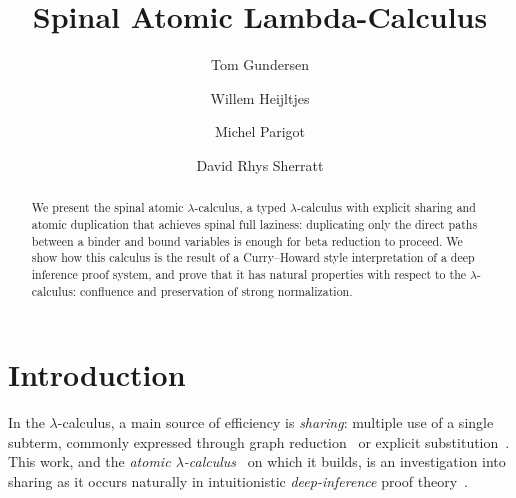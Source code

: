 \documentclass[a4paper,UKenglish,cleveref, autoref]{lipics-v2019}
\title{Spinal Atomic Lambda-Calculus}
\author
{Tom Gundersen}
{Red Hat, Inc.}
{teg@jklm.no}
{}
{}
\author
{Willem Heijltjes}
{University of Bath, UK \and \url{http://www.cs.bath.ac.uk/~wbh22/}}{w.b.heijltjes@bath.ac.uk}
{}
{Supported by EPSRC Project EP/R029121/1 \emph{Typed lambda-calculi with sharing and unsharing}}
\author
{Michel Parigot}
{Institut de Recherche en Informatique Fondamentale, CNRS \&\ Universit\'e de Paris, France} 
{michel.parigot@gmail.com}
{}
{Supported by ANR project 15-CE25-0014 FISP}
\author
{David Rhys Sherratt}
{Friedrich-Schiller University Jena, Germany}
{david.rhys.sherratt@uni-jena.de}
{}
{}
\begin{document}
\maketitle

\begin{abstract}
We present the spinal atomic $\lambda$-calculus, a typed $\lambda$-calculus with explicit sharing and atomic duplication that achieves spinal full laziness: duplicating only the direct paths between a binder and bound variables is enough for beta reduction to proceed. We show how this calculus is the result of a Curry--Howard style interpretation of a deep inference proof system, and prove that it has natural properties with respect to the $\lambda$-calculus: confluence and preservation of strong normalization.

\end{abstract}

\section{Introduction}

In the $\lambda$-calculus, a main source of efficiency is \emph{sharing}: multiple use of a single subterm, commonly expressed through graph reduction~\cite{Wadsworth-1971} or explicit substitution~\cite{Abadi-Cardelli-Curien-Levy-1991}. This work, and the \emph{atomic $\lambda$-calculus}~\cite{Gundersen-Heijltjes-Parigot-2013-LICS} on which it builds, is an investigation into sharing as it occurs naturally in intuitionistic \emph{deep-inference} proof theory~\cite{Tiu-2006}.
\end{document}
